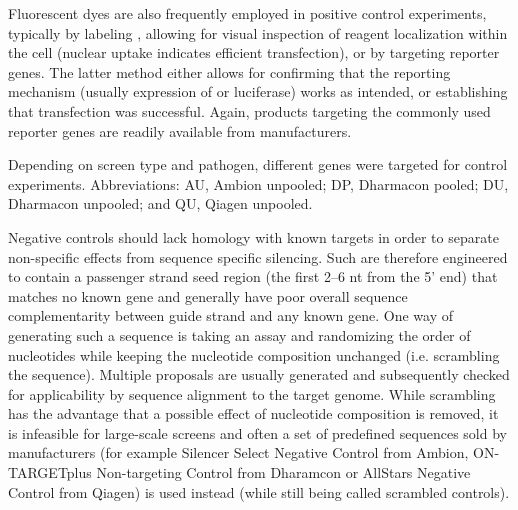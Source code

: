 Fluorescent dyes are also frequently employed in positive control experiments, typically by labeling , allowing for visual inspection of reagent localization within the cell (nuclear uptake indicates efficient transfection), or by targeting reporter genes. The latter method either allows for confirming that the reporting mechanism (usually expression of  or luciferase) works as intended, or establishing that  transfection was successful. Again,  products targeting the commonly used reporter genes are readily available from manufacturers.

\renewcommand{\arraystretch}{1.1}
\setlength{\tabcolsep}{0.14em}
\begin{table}
\begin{minipage}{\textwidth}
  \centering
  \caption[Control experiments used in the different screens.]{Depending on screen type and pathogen, different genes were targeted for control experiments. Abbreviations: AU, Ambion unpooled; DP, Dharmacon pooled; DU, Dharmacon unpooled; and QU, Qiagen unpooled.}
  \label{tab:infectx-control}
  \footnotesize
  
\end{minipage}
\end{table}

Negative controls should lack homology with known targets in order to separate non-specific effects from sequence specific silencing. Such  are therefore engineered to contain a passenger strand seed region (the first 2--6 nt from the 5' end) that matches no known gene and generally have poor overall sequence complementarity between guide strand and any known gene. One way of generating such a sequence is taking an assay  and randomizing the order of nucleotides while keeping the nucleotide composition unchanged (i.e. scrambling the sequence). Multiple proposals are usually generated and subsequently checked for applicability by sequence alignment to the target genome. While scrambling has the advantage that a possible effect of nucleotide composition is removed, it is infeasible for large-scale screens and often a set of predefined sequences sold by manufacturers (for example Silencer Select Negative Control from Ambion, ON-TARGETplus Non-targeting Control  from Dharamcon or AllStars Negative Control  from Qiagen) is used instead (while still being called scrambled controls). 

